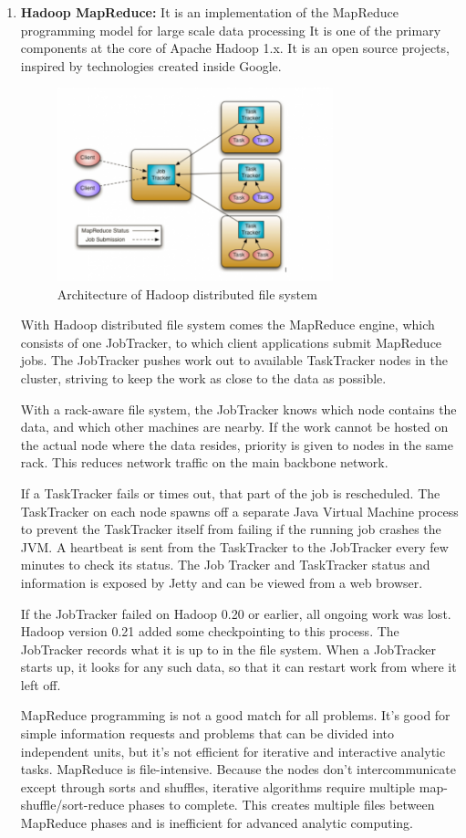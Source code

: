 \documentclass[conference]{IEEEtran}
\begin{document}
\begin{enumerate}
        \item \textbf{Hadoop MapReduce:}
                It is an implementation of the MapReduce programming model for large scale data processing
It is one of the primary components at the core of Apache Hadoop 1.x. It is an open source projects, inspired by technologies created inside Google.
\begin{figure}[h!]
        \centering
        \includegraphics[width=80mm]{mapreduce}
        \caption{Architecture of Hadoop distributed file system}
\end{figure}
With Hadoop distributed file system comes the MapReduce engine, which consists of one JobTracker, to which client applications submit MapReduce jobs.
The JobTracker pushes work out to available TaskTracker nodes in the cluster, striving to keep the work as close to the data as possible.
\par With a rack-aware file system, the JobTracker knows which node contains the data, and which other machines are nearby. If the work cannot be hosted on the actual node where the data resides, priority is given to nodes in the same rack. This reduces network traffic on the main backbone network.
\par If a TaskTracker fails or times out, that part of the job is rescheduled. The TaskTracker on each node spawns off a separate Java Virtual Machine process to prevent the TaskTracker itself from failing if the running job crashes the JVM. A heartbeat is sent from the TaskTracker to the JobTracker every few minutes to check its status. The Job Tracker and TaskTracker status and information is exposed by Jetty and can be viewed from a web browser.
\par If the JobTracker failed on Hadoop 0.20 or earlier, all ongoing work was lost. Hadoop version 0.21 added some checkpointing to this process. The JobTracker records what it is up to in the file system. When a JobTracker starts up, it looks for any such data, so that it can restart work from where it left off.
\par MapReduce programming is not a good match for all problems. It’s good for simple information requests and problems that can be divided into independent units, but it's not efficient for iterative and interactive analytic tasks. MapReduce is file-intensive. Because the nodes don’t intercommunicate except through sorts and shuffles, iterative algorithms require multiple map-shuffle/sort-reduce phases to complete. This creates multiple files between MapReduce phases and is inefficient for advanced analytic computing.


\end{enumerate}
\end{document}
